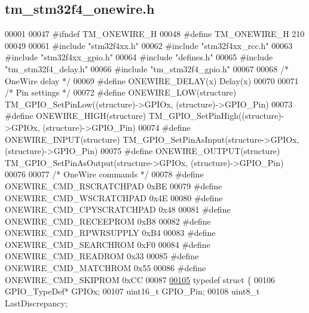 \hypertarget{tm__stm32f4__onewire_8h_source}{}\subsection{tm\+\_\+stm32f4\+\_\+onewire.\+h}

\begin{DoxyCode}
00001 
00047 \textcolor{preprocessor}{#ifndef TM\_ONEWIRE\_H}
00048 \textcolor{preprocessor}{#define TM\_ONEWIRE\_H 210}
00049 
00061 \textcolor{preprocessor}{#include "stm32f4xx.h"}
00062 \textcolor{preprocessor}{#include "stm32f4xx\_rcc.h"}
00063 \textcolor{preprocessor}{#include "stm32f4xx\_gpio.h"}
00064 \textcolor{preprocessor}{#include "defines.h"}
00065 \textcolor{preprocessor}{#include "tm\_stm32f4\_delay.h"}
00066 \textcolor{preprocessor}{#include "tm\_stm32f4\_gpio.h"}
00067 
00068 \textcolor{comment}{/* OneWire delay */}
00069 \textcolor{preprocessor}{#define ONEWIRE\_DELAY(x)                Delay(x)}
00070 
00071 \textcolor{comment}{/* Pin settings */}
00072 \textcolor{preprocessor}{#define ONEWIRE\_LOW(structure)          TM\_GPIO\_SetPinLow((structure)->GPIOx, (structure)->GPIO\_Pin)}
00073 \textcolor{preprocessor}{#define ONEWIRE\_HIGH(structure)         TM\_GPIO\_SetPinHigh((structure)->GPIOx, (structure)->GPIO\_Pin)}
00074 \textcolor{preprocessor}{#define ONEWIRE\_INPUT(structure)        TM\_GPIO\_SetPinAsInput(structure->GPIOx, (structure)->GPIO\_Pin)}
00075 \textcolor{preprocessor}{#define ONEWIRE\_OUTPUT(structure)       TM\_GPIO\_SetPinAsOutput(structure->GPIOx, (structure)->GPIO\_Pin)}
00076 
00077 \textcolor{comment}{/* OneWire commands */}
00078 \textcolor{preprocessor}{#define ONEWIRE\_CMD\_RSCRATCHPAD         0xBE}
00079 \textcolor{preprocessor}{#define ONEWIRE\_CMD\_WSCRATCHPAD         0x4E}
00080 \textcolor{preprocessor}{#define ONEWIRE\_CMD\_CPYSCRATCHPAD       0x48}
00081 \textcolor{preprocessor}{#define ONEWIRE\_CMD\_RECEEPROM           0xB8}
00082 \textcolor{preprocessor}{#define ONEWIRE\_CMD\_RPWRSUPPLY          0xB4}
00083 \textcolor{preprocessor}{#define ONEWIRE\_CMD\_SEARCHROM           0xF0}
00084 \textcolor{preprocessor}{#define ONEWIRE\_CMD\_READROM             0x33}
00085 \textcolor{preprocessor}{#define ONEWIRE\_CMD\_MATCHROM            0x55}
00086 \textcolor{preprocessor}{#define ONEWIRE\_CMD\_SKIPROM             0xCC}
00087 
\hypertarget{tm__stm32f4__onewire_8h_source_l00105}{}\hyperlink{struct_t_m___one_wire__t}{00105} \textcolor{keyword}{typedef} \textcolor{keyword}{struct }\{
00106     GPIO\_TypeDef* GPIOx;
00107     uint16\_t GPIO\_Pin;
00108     uint8\_t LastDiscrepancy;

\end{DoxyCode}
